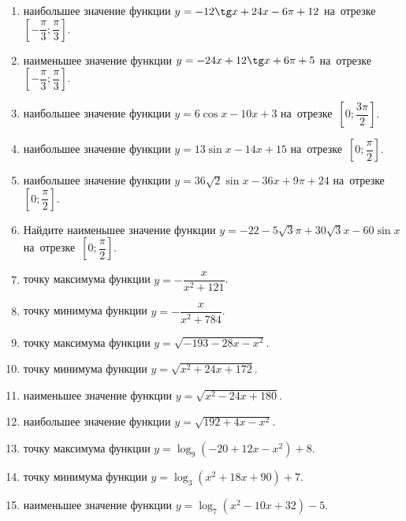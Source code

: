 \documentclass[a4paper,10pt]{article}
\begin{document}
\begin{enumerate}
\item {} наибольшее значение функции $y=-12\tg x +24x-6\pi +12$ на~отрезке~$\left[-\dfrac{\pi}{3};\dfrac{\pi}{3}\right]$.

\item {} наименьшее значение функции $y=-24x +12\tg x+6\pi+5$ на~отрезке~$\left[-\dfrac{\pi}{3};\dfrac{\pi}{3}\right]$.

\item {} наибольшее значение функции $y=6\cos x-10x+3$ на~отрезке~$\left[0;\dfrac{3\pi}{2}\right]$.

\item {} наибольшее значение функции $y=13\sin x-14x+15$ на~отрезке~$\left[0;\dfrac{\pi}{2}\right]$.

\item {} наибольшее значение функции $y=36\sqrt{2}\sin x-36x+9\pi +24$ на~отрезке~$\left[0;\dfrac{\pi}{2}\right]$.

\item Найдите наименьшее значение функции $y=-22-5\sqrt{3}\pi+30\sqrt{3}x-60\sin x$ на~отрезке~$\left[0;\dfrac{\pi}{2}\right]$.

\item {} точку максимума функции $y=-\dfrac{x}{ x^2 +121}$.

\item {} точку минимума функции $y=-\dfrac{x}{ x^2 +784}$.

\item {} точку максимума функции $y=\sqrt{-193-28x-x^2}$.

\item {} точку минимума функции $y=\sqrt{x^2+24x+172}$.

\item {} наименьшее значение функции $y=\sqrt{x^2-24x+180}$.

\item {} наибольшее значение функции $y=\sqrt{192+4x-x^2}$.

\item {} точку максимума функции $y=\log_9\left(-20+12x-x^2\right)+8$.

\item {} точку минимума функции $y=\log_3\left(x^2+18x+90\right)+7$.

\item {} наименьшее значение функции $y=\log_7\left(x^2-10x+32\right)-5$.


\end{enumerate}
\end{document}
